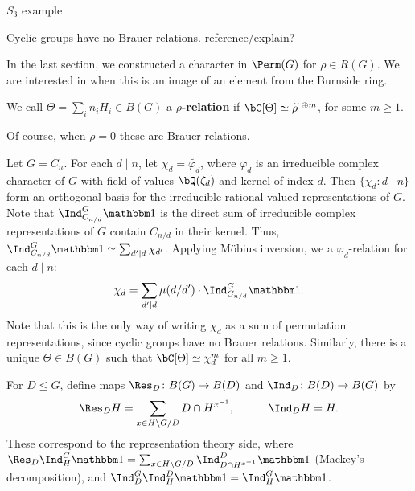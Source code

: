 \begin{example}
    {\color{red} $S_3$ example}
\end{example}

\begin{example}
Cyclic groups have no Brauer relations. {\color{red} reference/explain?}
\end{example}

In the last section, we constructed a character in $\Perm(G)$ for $\rho \in R(G)$. We are interested in when this is an image of an element from the Burnside ring.

\begin{defn}
We call $\Theta = \sum_i n_i H_i \in B(G)$ a \textbf{$\rho$-relation} if $\bC[\Theta] \simeq \widetilde{\rho}^{\ \oplus m}$, for some $m \geq 1$.
\end{defn}
Of course, when $\rho = 0$ these are Brauer relations. 


\begin{example}\label{cyclic-relns}
    Let $G = C_n$. For each $d \mid n$, let $\chi_d = \widetilde{\varphi_d}$, where $\varphi_d$ is an irreducible complex character of $G$ with field of values $\bQ(\zeta_d)$ and kernel of index $d$.
    Then $\{ \chi_d \colon d\mid n \}$ form an orthogonal basis for the irreducible rational-valued representations of $G$. Note that $\Ind_{C_{n/ d}}^G \trivial$ is the direct sum of irreducible complex representations of $G$ contain $C_{n / d}$ in their kernel. Thus, $\Ind_{C_{n/ d}}^G \trivial \simeq \sum_{d' \mid d} \chi_{d'}$. Applying M\"{o}bius inversion, we a $\varphi_d$-relation for each $d \mid n$:
    \[ \chi_d = \sum_{d' \mid d} \mu(d / d') \cdot \Ind_{C_{n/ d}}^G \trivial. \]
    Note that this is the only way of writing $\chi_d$ as a sum of permutation representations, since cyclic groups have no Brauer relations. Similarly, there is a unique $\Theta \in B(G)$ such that $\bC[\Theta] \simeq \chi_d^{m}$ for all $m \geq 1$.
    \end{example}

\begin{notn}
    For $D \leq G$, define maps $\Res_D \colon B(G) \to B(D)$ and $\Ind_D \colon B(D) \to B(G)$ by
    \[  \Res_D H = \sum_{x \in H \backslash G / D} D \cap H^{x^{-1}}, \qquad \quad \Ind_D H = H. \]
    These correspond to the representation theory side, where $\Res_D \Ind_{H}^G \trivial = \sum_{x \in H \backslash G / D} \Ind_{D \cap H^{x^{-1}}}^D \trivial$ (Mackey's decomposition), and $\Ind_{D}^G\Ind_{H}^D \trivial = \Ind_{H}^G \trivial$.
\end{notn}